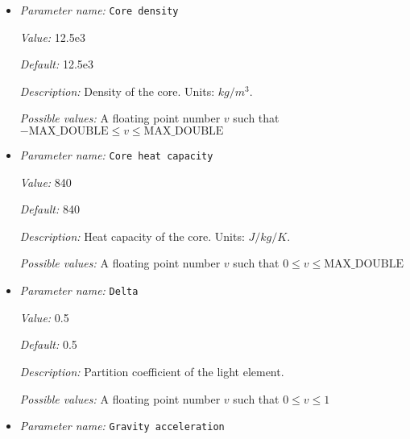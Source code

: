 \begin{itemize}
{\it Value:} 60


{\it Default:} 60


{\it Description:} Core heat conductivity $k_c$. Units: $W/m/K$.


{\it Possible values:} A floating point number $v$ such that $0 \leq v \leq \text{MAX\_DOUBLE}$
\item {\it Parameter name:} {\tt Core density}
\label{parameters:Boundary temperature model/Dynamic core/Core density}
\label{parameters:Boundary_20temperature_20model/Dynamic_20core/Core_20density}


{\it Value:} 12.5e3


{\it Default:} 12.5e3


{\it Description:} Density of the core. Units: $kg/m^3$.


{\it Possible values:} A floating point number $v$ such that $-\text{MAX\_DOUBLE} \leq v \leq \text{MAX\_DOUBLE}$
\item {\it Parameter name:} {\tt Core heat capacity}
\label{parameters:Boundary temperature model/Dynamic core/Core heat capacity}
\label{parameters:Boundary_20temperature_20model/Dynamic_20core/Core_20heat_20capacity}


{\it Value:} 840


{\it Default:} 840


{\it Description:} Heat capacity of the core. Units: $J/kg/K$.


{\it Possible values:} A floating point number $v$ such that $0 \leq v \leq \text{MAX\_DOUBLE}$
\item {\it Parameter name:} {\tt Delta}
\label{parameters:Boundary temperature model/Dynamic core/Delta}
\label{parameters:Boundary_20temperature_20model/Dynamic_20core/Delta}


{\it Value:} 0.5


{\it Default:} 0.5


{\it Description:} Partition coefficient of the light element.


{\it Possible values:} A floating point number $v$ such that $0 \leq v \leq 1$
\item {\it Parameter name:} {\tt Gravity acceleration}
\label{parameters:Boundary temperature model/Dynamic core/Gravity acceleration}
\label{parameters:Boundary_20temperature_20model/Dynamic_20core/Gravity_20acceleration}



\end{itemize}
